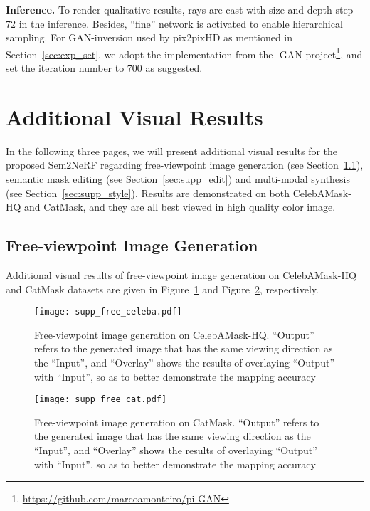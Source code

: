\documentclass[runningheads]{llncs}
\begin{document}
\textbf{Inference.} To render qualitative results, rays are cast with size  and depth step 72 in the inference. Besides, ``fine'' network is activated to enable hierarchical sampling. For GAN-inversion used by pix2pixHD as mentioned in Section~\ref{sec:exp_set}, we adopt the implementation from the -GAN project\footnote{\url{https://github.com/marcoamonteiro/pi-GAN}}, and set the iteration number to 700 as suggested.



\section{Additional Visual Results} \label{sec:result}
 
In the following three pages, we will present additional visual results for the proposed Sem2NeRF regarding free-viewpoint image generation (see Section~\ref{sec:supp_free}), semantic mask editing (see Section~\ref{sec:supp_edit}) and multi-modal synthesis (see Section~\ref{sec:supp_style}). Results are demonstrated on both CelebAMask-HQ and CatMask, and they are all best viewed in high quality color image.


\clearpage

\subsection{Free-viewpoint Image Generation} \label{sec:supp_free}

Additional visual results of free-viewpoint image generation on CelebAMask-HQ and CatMask datasets are given in Figure~\ref{fig:supp_free_celeba} and Figure~\ref{fig:supp_free_cat}, respectively. 

\begin{figure}[h!]
    \centering
    \texttt{[image: supp\_free\_celeba.pdf]}
\caption{Free-viewpoint image generation on CelebAMask-HQ. ``Output'' refers to the generated image that has the same viewing direction as the ``Input'', and ``Overlay'' shows the results of overlaying ``Output'' with ``Input'', so as to better demonstrate the mapping accuracy}
\label{fig:supp_free_celeba}
\end{figure}



\begin{figure}[h!]
    \centering
    \texttt{[image: supp\_free\_cat.pdf]}
\caption{Free-viewpoint image generation on CatMask. ``Output'' refers to the generated image that has the same viewing direction as the ``Input'', and ``Overlay'' shows the results of overlaying ``Output'' with ``Input'', so as to better demonstrate the mapping accuracy}
\label{fig:supp_free_cat}
\end{figure}
\end{document}

